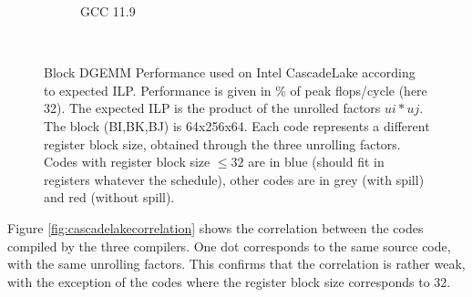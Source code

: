 \documentclass{article}
\begin{document}
\begin{figure}[h!]
\begin{subfigure}[h]{0.45\textwidth}
  \caption{GCC 11.9}
  \end{subfigure}\hfill ~
  \caption{Block DGEMM Performance used on Intel CascadeLake according to expected ILP. Performance is given in \% of peak flops/cycle (here 32). The expected ILP is the product of the unrolled factors $ui * uj$. The block (BI,BK,BJ) is 64x256x64. Each code represents a different register block size, obtained through the three unrolling factors. Codes with register block size $\leq 32$ are in blue (should fit in registers whatever the schedule), other codes are in grey (with spill) and red (without spill).\label{fig:cascadelakeilp}}
\end{figure}



Figure \ref{fig:cascadelakecorrelation}  shows the correlation between the codes compiled by the three compilers. One dot corresponds to the same source code, with the same unrolling factors. This confirms that the correlation is rather weak, with the exception of the codes where the register block size corresponds to 32.  
\end{document}
